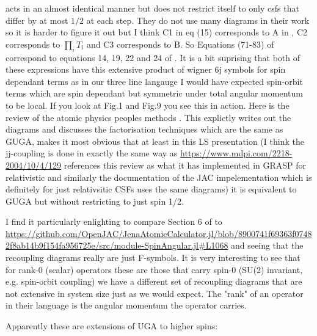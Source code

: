 \documentclass[aps,prx,twocolumn,floatfix,10pt,amssymb,amsfont,amsmath,superscriptaddress,float,nofootinbib,longbibliography,nobalancelastpage]{revtex4-2}
\begin{document}
\cite{gaigalas1997efficient} acts in an almost identical manner but does not restrict itself to only csfs that differ by at most $1/2$ at each step. They do not use many diagrams in their work so it is harder to figure it out but I think C1 in eq (15) corresponds to A in \cite{lang2025treating}, C2 corresponds to $\prod_i T_i$ and C3 corresponds to B. So Equations (71-83) of \cite{lang2025treating} correspond to equations 14, 19, 22 and 24 of \cite{gaigalas1997efficient}. It is a bit suprising that both of these expressions have this extensive product of wigner 6j symbols for spin dependant terms as in our three line langauge I would have expected spin-orbit terms which are spin dependant but symmetric under total angular momentum to be local. If you look at \cite{gaigalas2021angular} Fig.1 and \cite{lang2025treating} Fig.9 you see this in action. Here is the review of the atomic physics peoples methods \cite{gaigalas2004integration}. This explictly writes out the diagrams and discusses the factorisation techniques which are the same as GUGA, makes it most obvious that at least in this LS presentation (I think the jj-coupling is done in exactly the same way as \url{https://www.mdpi.com/2218-2004/10/4/129} references this review as what it has implemented in GRASP for relativistic and similarly the documentation of the JAC impelementation which is definitely for just relativsitic CSFs uses the same diagrams)  it is equivalent to GUGA but without restricting to just spin 1/2.

I find it particularly enlighting to compare Section 6 of \cite{gaigalas2004integration} to \url{https://github.com/OpenJAC/JenaAtomicCalculator.jl/blob/8900741f69363f07482f8ab14b9f154fa956725e/src/module-SpinAngular.jl#L1068} and seeing that the recoupling diagrams really are just F-symbols. It is very interesting to see that for rank-0 (scalar) operators these are those that carry spin-0 (SU(2) invariant, e.g. spin-orbit coupling) we have a different set of recoupling diagrams that are not extensive in system size just as we would expect. The "rank" of an operator in their language is the angular momentum the operator carries.

Apparently these are extensions of UGA to higher spins: \cite{kent1991multibody, kent1989graphical}


\end{document}
